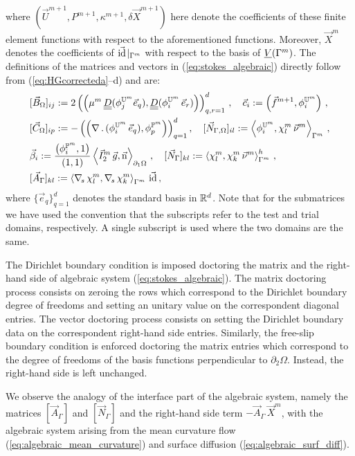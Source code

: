 where $(\vec U^{m+1},P^{m+1},\kappa^{m+1},\delta\vec X^{m+1})$ here denote the
coefficients of these finite element functions with respect to the
aforementioned functions. Moreover, $\vec X^m$ denotes the coefficients of
$\vec{\rm id}\!\mid_{\Gamma^m}$ with respect to the basis of $\underline{V}(\Gamma^m)$. The definitions
of the matrices and vectors in (\ref{eq:stokes_algebraic}) directly follow from
(\ref{eq:HGcorrecteda}--d) and are:
\begin{align*}
& [\vec B_\Omega]_{ij} := 2\left(\left(\mu^m\,\mat D(\phi_j^{\uspacesimple^m}
\vec e_q), \mat D( \phi_i^{\uspacesimple^m}\,\vec e_r) \right)
\right)_{q,r=1}^d\,,\quad
\vec c_i := \left( \vec f^{m+1},\phi_i^{\uspacesimple^m}\right)\,,\\
&[\vec C_\Omega]_{ip} := - \left(
\left(\nabla\,.\,(\phi_i^{\uspacesimple^m}\,\vec
e_q), \phi_p^{\pspace^m} \right) \right)_{q=1}^d,\quad
[\Nbulk]_{il} := \left\langle \phi_i^{\uspacesimple^m}, \chi^m_l \,\vec\nu^m
\right\rangle_{\Gamma^m} \,,\\
& \vec \beta_i := \frac{\left(\phi_i^{\pspace^m},1\right)}{\left(1,1\right)}
\left\langle \vec I_2^m\,\vec g,\unitn\right\rangle_{\partial_1\Omega}\,,\quad
[\vec N_\Gamma]_{kl} := \left\langle \chi^m_l, \chi^m_k\,\vec\nu^m
\right\rangle_{\Gamma^m}^h \,,\\
& [\vec A_\Gamma]_{kl} := \left\langle \nabs\,\chi^m_l, \nabs\,\chi^m_k
\right\rangle_{\Gamma^m} \,\vec\id \,,
\end{align*}
where $\{\vec e_q\}_{q=1}^d$ denotes the standard basis in $\mathbb R^d$. Note that
for the submatrices we have used the convention that the subscripts refer to
the test and trial domains, respectively. A single subscript is used where the
two domains are the same.

The Dirichlet boundary condition is imposed doctoring the matrix and the
right-hand side of algebraic system (\ref{eq:stokes_algebraic}). The matrix
doctoring process consists on zeroing the rows which correspond to the Dirichlet
boundary degree of freedoms and setting an unitary value on the correspondent
diagonal entries. The vector doctoring process consists on setting the Dirichlet
boundary data on the correspondent right-hand side entries. Similarly, the
free-slip boundary condition is enforced doctoring the matrix entries which
correspond to the degree of freedoms of the basis functions perpendicular to
$\partial_2\Omega$. Instead, the right-hand side is left unchanged.

We observe the analogy of the interface part of the algebraic system,
namely the matrices $[\vec A_\Gamma]$ and $[\vec N_\Gamma]$ and the right-hand
side term $-\vec A_\Gamma\,\vec X^m$, with the algebraic system arising
from the mean curvature flow (\ref{eq:algebraic_mean_curvature}) and surface
diffusion (\ref{eq:algebraic_surf_diff}).

